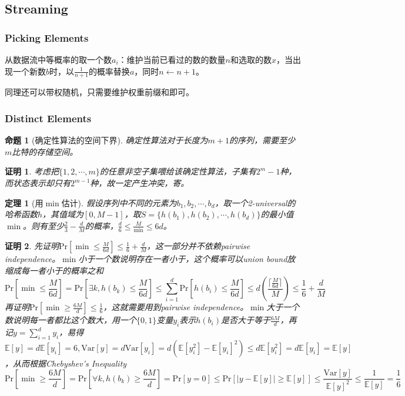 \documentclass[8pt]{article}
\theoremstyle{compact}
\newtheorem{theorem}{定理}
\newtheorem{proposition}{命题}
\newtheorem{Proof}{证明}
\def\le{\leqslant}
\def\ge{\geqslant}
\def\Pr#1{\text{Pr}\left[{#1}\right]}
\def\E#1{\mathbb{E}\left[{#1}\right]}
\def\Var#1{\text{Var}\left[{#1}\right]}
\begin{document}
\subsection{Streaming}
\subsubsection{Picking Elements}
从数据流中等概率的取一个数$a_i$：维护当前已看过的数的数量$n$和选取的数$x$，当出现一个新数$b$时，以$\frac{1}{n+1}$的概率替换$a$，同时$n \gets n + 1$。

同理还可以带权随机，只需要维护权重前缀和即可。
\subsubsection{Distinct Elements}
\begin{proposition}[确定性算法的空间下界]
	确定性算法对于长度为$m+1$的序列，需要至少$m$比特的存储空间。
\end{proposition}
\begin{Proof}
	考虑把$\{1, 2, \cdots, m\}$的任意非空子集喂给该确定性算法，子集有$2^m-1$种，而状态表示却只有$2^{m-1}$种，故一定产生冲突，寄。
\end{Proof}
\begin{theorem}[用$\min$估计]
	假设序列中不同的元素为$b_1, b_2, \cdots, b_d$，取一个2-universal的哈希函数$h$，其值域为$[0, M-1]$，取$S = \{h(b_1), h(b_2), \cdots, h(b_d)\}$的最小值$\min$。则有至少$\frac23 - \frac{d}{M}$的概率，$\frac d6 \le \frac{M}{\min} \le 6d$。
\end{theorem}
\begin{Proof}
	先证明$\Pr{\min \le \frac{M}{6d}} \le \frac16 + \frac dM$，这一部分并不依赖pairwise independence。$\min$小于一个数说明存在一者小于，这个概率可以union bound放缩成每一者小于的概率之和
	\begin{equation}
		\Pr{\min \le \frac{M}{6d}}  = \Pr{\exists k, h(b_k) \le \frac{M}{6d}} \le \sum_{i=1}^{d} \Pr{h(b_i) \le \frac {M}{6d}} \le d\left(\frac{\lceil\frac{M}{6d}\rceil}{M}\right) \le \frac16 + \frac dM
	\end{equation}	
	再证明$\Pr{\min \ge \frac{6M}{d}} \le \frac16$，这就需要用到pairwise independence。$\min$大于一个数说明每一者都比这个数大，用一个$\{0, 1\}$变量$y_i$表示$h(b_i)$是否大于等于$\frac{6M}{d}$，再记$y = \sum\limits_{i=1}^{d}y_i$，易得$\E{y} = d\E{y_i} = 6, \Var{y} = d\Var{y_i} = d(\E{y_i^2} - \E{y_i}^2) \le d\E{y_i^2} = d\E{y_i} = \E{y}$，从而根据Chebyshev's Inequality
	\begin{equation}
	\Pr{\min \ge \frac{6M}{d}} = \Pr{\forall k, h(b_k) \ge \frac{6M}{d}} = \Pr{y = 0} \le \Pr{|y - \E{y}| \ge \E{y}} \le \frac{\Var{y}}{\E{y}^2} \le \frac{1}{\E{y}} = \frac 16
	\end{equation}
	
\end{Proof}
\end{document}
